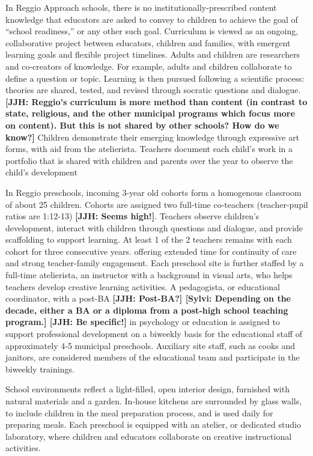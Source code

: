 In Reggio Approach schools, there is no institutionally-prescribed content knowledge that educators are asked to convey to children to achieve the goal of ``school readiness,'' or any other such goal. Curriculum is viewed as an ongoing, collaborative project between educators, children and families, with emergent learning goals and flexible project timelines. Adults and children are researchers and co-creators of knowledge. For example, adults and children collaborate to define a question or topic. Learning is then pursued following a scientific process: theories are shared, tested, and revised through socratic questions and dialogue. \textbf{[JJH: Reggio's curriculum is more method than content (in contrast to state, religious, and the other municipal programs which focus more on content). But this is not shared by other schools? How do we know?]} Children demonstrate their emerging knowledge through expressive art forms, with aid from the atelierista. Teachers document each child's work in a portfolio that is shared with children and parents over the year to observe the child's development \citep{Rinaldi_2006_ReggioEmilia_BOOK,Giudici-Nicolosi_2014_Reggio-Approach}

In Reggio preschools, incoming 3-year old cohorts form a homogenous classroom of about 25 children. Cohorts are assigned two full-time co-teachers (teacher-pupil ratios are 1:12-13) \textbf{[JJH: Seems high!]}. Teachers observe children's development, interact with children through questions and dialogue, and provide scaffolding to support learning. At least 1 of the 2 teachers remains with each cohort for three consecutive years. offering extended time for continuity of care and strong teacher-family engagement. Each preschool site is further staffed by a full-time atelierista, an instructor with a background in visual arts, who helps teachers develop creative learning activities. A pedagogista, or educational coordinator, with a post-BA \textbf{[JJH: Post-BA?] [Sylvi: Depending on the decade, either a BA or a diploma from a post-high school teaching program.] [JJH: Be specific!]} in psychology or education is assigned to support professional development on a biweekly basis for the educational staff of approximately 4-5 municipal preschools. Auxiliary site staff, such as cooks and janitors, are considered members of the educational team and participate in the biweekly trainings.

School environments reflect a light-filled, open interior design, furnished with natural materials and a garden. In-house kitchens are surrounded by glass walls, to include children in the meal preparation process, and is used daily for preparing meals. Each preschool is equipped with an atelier, or dedicated studio laboratory, where children and educators collaborate on creative instructional activities.

